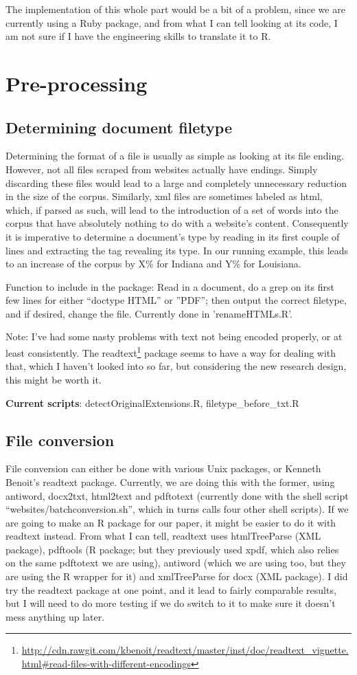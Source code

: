 \documentclass[11pt]{article}
\begin{document}
The implementation of this whole part would be a bit of a problem, since we are currently using a Ruby package, and from what I can tell looking at its code, I am not sure if I have the engineering skills to translate it to R.

\section{Pre-processing}
\subsection{Determining document filetype}
Determining the format of a file is usually as simple as looking at its file ending. However, not all files scraped from websites actually have endings. Simply discarding these files would lead to a large and completely unnecessary reduction in the size of the corpus. Similarly, xml files are sometimes labeled as html, which, if parsed as such, will lead to the introduction of a set of words into the corpus that have absolutely nothing to do with a website's content. Consequently it is imperative to determine a document's type by reading in its first couple of lines and extracting the tag revealing its type. In our running example, this leads to an increase of the corpus by X\% for Indiana and Y\% for Louisiana.

Function to include in the package: Read in a document, do a grep on its first few lines for either ``doctype HTML'' or ''PDF''; then output the correct filetype, and if desired, change the file. Currently done in 'renameHTMLs.R'.

Note: I've had some nasty problems with text not being encoded properly, or at least consistently. The readtext\footnote{\url{http://cdn.rawgit.com/kbenoit/readtext/master/inst/doc/readtext_vignette.html\#read-files-with-different-encodings}} package seems to have a way for dealing with that, which I haven't looked into so far, but considering the new research design, this might be worth it.

\textbf{Current scripts}: detectOriginalExtensions.R, filetype\_before\_txt.R

\subsection{File conversion}
File conversion can either be done with various Unix packages, or Kenneth Benoit's readtext package. Currently, we are doing this with the former, using antiword, docx2txt, html2text and pdftotext (currently done with the shell script ``websites/batchconversion.sh'', which in turns calls four other shell scripts). If we are going to make an R package for our paper, it might be easier to do it with readtext instead. From what I can tell, readtext uses htmlTreeParse (XML package), pdftools (R package; but they previously used xpdf, which also relies on the same pdftotext we are using), antiword (which we are using too, but they are using the R wrapper for it) and xmlTreeParse for docx (XML package). I did try the readtext package at one point, and it lead to fairly comparable results, but I will need to do more testing if we do switch to it to make sure it doesn't mess anything up later.
\end{document}
